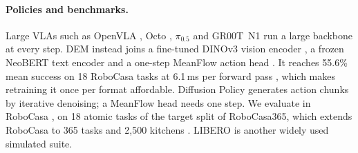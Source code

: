 \paragraph{Policies and benchmarks.}
Large VLAs such as OpenVLA \citep{kim2024openvla}, %
Octo \citep{octo2024}, %
$\pi_{0.5}$ and GR00T~N1 \citep{bjorck2025gr00tn1} %
run a large backbone at every step. DEM instead joins a fine-tuned DINOv3
vision encoder \citep{simeoni2025dinov3}, %
a frozen NeoBERT text encoder \citep{lebreton2025neobert} %
and a one-step MeanFlow action head \citep{geng2025meanflow}. %
It reaches 55.6\% mean success on 18 RoboCasa tasks at 6.1\,ms per forward
pass \citep{sun2026dem}, %
which makes retraining it once per format affordable. Diffusion Policy
\citep{chi2023diffusion} %
generates action chunks by iterative denoising; a MeanFlow head needs one
step. We evaluate in RoboCasa \citep{nasiriany2024robocasa}, %
on 18 atomic tasks of the target split of RoboCasa365, which extends RoboCasa
to 365 tasks and 2,500 kitchens \citep{nasiriany2026robocasa365}.
LIBERO \citep{liu2023libero} %
is another widely used simulated suite.
